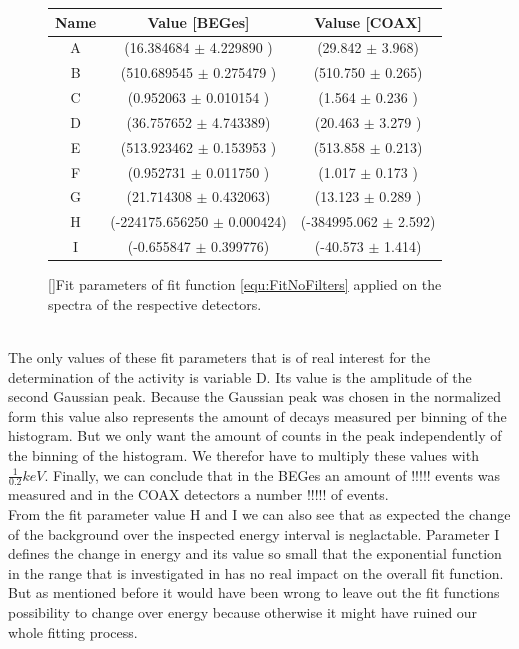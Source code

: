 \begin{figure}[t!]
\centering
\begin{tabular}{|c|c|c|}
\hline
Name	& Value [BEGes] & Valuse [COAX]\\ 
\hline
A  &	(16.384684 \(\pm\)	4.229890	)&	(29.842 \(\pm\)	3.968)	\\	
\hline
B  &	(510.689545  \(\pm\)	0.275479	)&	(510.750 \(\pm\)	0.265)\\	
\hline
C  &	(0.952063 \(\pm\)	0.010154	)	&	(1.564 \(\pm\)	0.236	)	\\
\hline
D  &	(36.757652 \(\pm\)	4.743389)	&	(20.463 \(\pm\)	3.279	)	\\
\hline
E  &	(513.923462 \(\pm\)	0.153953	)	&	(513.858 \(\pm\)	0.213)	\\
\hline
F  &	(0.952731 \(\pm\)	0.011750	)	&	(1.017 \(\pm\)	0.173	)	\\
\hline
G  &	(21.714308 \(\pm\)	0.432063)	&	(13.123 \(\pm\)	0.289	)	\\
\hline
H  &	(-224175.656250 \(\pm\)	0.000424)	&	(-384995.062 \(\pm\)	2.592)	\\
\hline
I  &	(-0.655847 \(\pm\) 0.399776)	&	(-40.573 \(\pm\)	1.414)\\
\hline

\end{tabular}
\label{tab:FitParNoFilter}
[]{Fit parameters of fit function \ref{equ:FitNoFilters} applied on the spectra of the respective detectors.}
\end{figure}
\\



The only values of these fit parameters that is of real interest for the determination of the activity is variable D.
Its value is the amplitude of the second Gaussian peak.
Because the Gaussian peak was chosen in the normalized form this value also represents the amount of \Kr decays measured per binning of the histogram.
But we only want the amount of counts in the peak independently of the binning of the histogram.
We therefor have to multiply these values with $\frac{1}{0.2}\unit{keV}$.
Finally, we can conclude that in the BEGes an amount of !!!!! events was measured and in the COAX detectors a number !!!!! of events.
\\


From the fit parameter value H and I we can also see that as expected the change of the background over the inspected energy interval is neglactable.
Parameter I defines the change in energy and its value so small that the exponential function in the range that is investigated in has no real impact on the overall fit function.
But as mentioned before it would have been wrong to leave out the fit functions possibility to change over energy because otherwise it might have ruined our whole fitting process. 
\\


